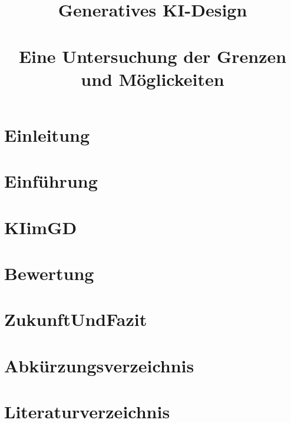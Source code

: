\documentclass[conference]{IEEEtran}
\begin{document}

\title{Generatives KI-Design\\
\large \ \\ \large Eine Untersuchung der Grenzen und Möglickeiten}

\author{

  \and

}

\maketitle



\section{Einleitung}


\section{Einführung}


\section{KIimGD}


\section{Bewertung}


\section{ZukunftUndFazit}


\listoffigures
{}

\section*{Abkürzungsverzeichnis}


\section*{Literaturverzeichnis}
\printbibliography[heading=none]{}
\end{document}
